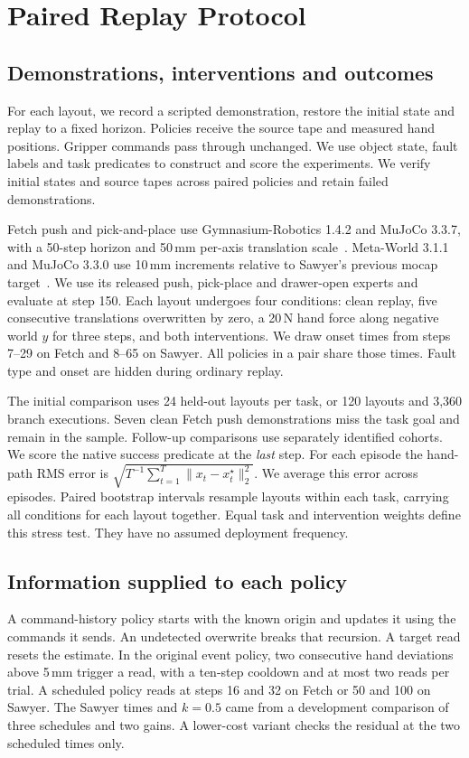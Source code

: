 \section{Paired Replay Protocol}
\subsection{Demonstrations, interventions and outcomes}
For each layout, we record a scripted demonstration, restore the initial state and replay to a fixed horizon. Policies receive the source tape and measured hand positions. Gripper commands pass through unchanged. We use object state, fault labels and task predicates to construct and score the experiments. We verify initial states and source tapes across paired policies and retain failed demonstrations.

Fetch push and pick-and-place use Gymnasium-Robotics 1.4.2 and MuJoCo 3.3.7, with a 50-step horizon and 50\,mm per-axis translation scale~\cite{plappert2018fetch}. Meta-World 3.1.1 and MuJoCo 3.3.0 use 10\,mm increments relative to Sawyer's previous mocap target~\cite{yu2020metaworld,mclean2025metaworld}. We use its released push, pick-place and drawer-open experts and evaluate at step 150. Each layout undergoes four conditions: clean replay, five consecutive translations overwritten by zero, a 20\,N hand force along negative world $y$ for three steps, and both interventions. We draw onset times from steps 7--29 on Fetch and 8--65 on Sawyer. All policies in a pair share those times. Fault type and onset are hidden during ordinary replay.

The initial comparison uses 24 held-out layouts per task, or 120 layouts and 3,360 branch executions. Seven clean Fetch push demonstrations miss the task goal and remain in the sample. Follow-up comparisons use separately identified cohorts. We score the native success predicate at the \emph{last} step. For each episode the hand-path RMS error is $\sqrt{T^{-1}\sum_{t=1}^{T}\|x_t-x_t^\star\|_2^2}$. We average this error across episodes. Paired bootstrap intervals resample layouts within each task, carrying all conditions for each layout together. Equal task and intervention weights define this stress test. They have no assumed deployment frequency.

\subsection{Information supplied to each policy}
A command-history policy starts with the known origin and updates it using the commands it sends. An undetected overwrite breaks that recursion. A target read resets the estimate. In the original event policy, two consecutive hand deviations above 5\,mm trigger a read, with a ten-step cooldown and at most two reads per trial. A scheduled policy reads at steps 16 and 32 on Fetch or 50 and 100 on Sawyer. The Sawyer times and $k=0.5$ came from a development comparison of three schedules and two gains. A lower-cost variant checks the residual at the two scheduled times only.

